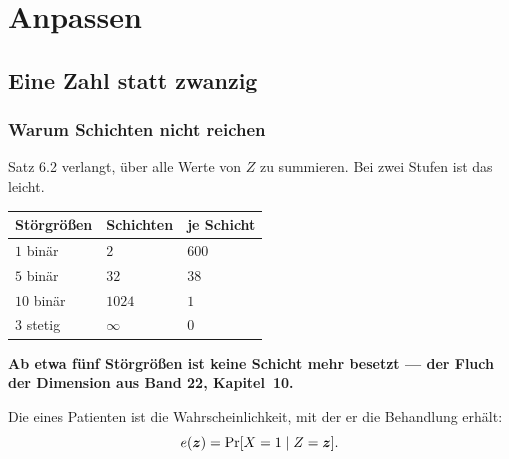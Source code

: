 \part{Anpassen}

\chapter{Eine Zahl statt zwanzig}

\section{Warum Schichten nicht reichen}

\begin{merksatz}
Satz 6.2 verlangt, über alle Werte von $Z$ zu summieren. Bei zwei Stufen ist das leicht.

\begin{center}
{\small
\renewcommand{\arraystretch}{1.48}
\begin{tabular}{@{}P{3.0cm}P{2.6cm}P{2.6cm}@{}}
\toprule
\textbf{Störgrößen} & \textbf{Schichten} & \textbf{je Schicht}\\
\midrule
$1$ binär & $2$ & $600$\\
$5$ binär & $32$ & $38$\\
$10$ binär & $1024$ & $1$\\
$3$ stetig & $\infty$ & $0$\\
\bottomrule
\end{tabular}}
\end{center}

\begin{center}
\begin{minipage}{0.9\textwidth}
\textbf{Ab etwa fünf Störgrößen ist keine Schicht mehr besetzt --- der Fluch der Dimension aus Band 22, Kapitel~10.}
\end{minipage}
\end{center}
\end{merksatz}

\begin{definition}
Die  eines Patienten ist die Wahrscheinlichkeit, mit der er die Behandlung erhält:
\[ e(\boldsymbol{z}) = \Pr[X=1 \mid Z=\boldsymbol{z}] . \]
\end{definition}

